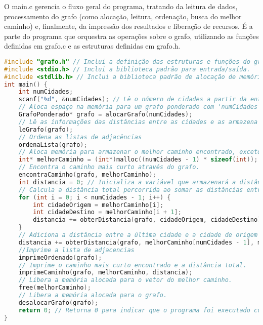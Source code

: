 \documentclass{article}
\begin{document}
O main.c gerencia o fluxo geral do programa, tratando da leitura de dados, processamento do grafo (como alocação, leitura, ordenação, busca do melhor caminho) e, finalmente, da impressão dos resultados e liberação de recursos. É a parte do programa que orquestra as operações sobre o grafo, utilizando as funções definidas em grafo.c e as estruturas definidas em grafo.h.
\begin{lstlisting}[caption={main.c},label={lst:cod1},language=C]
#include "grafo.h" // Inclui a definição das estruturas e funções do grafo.
#include <stdio.h> // Inclui a biblioteca padrão para entrada/saída.
#include <stdlib.h> // Inclui a biblioteca padrão de alocação de memória.
int main() {
    int numCidades;
    scanf("%d", &numCidades); // Lê o número de cidades a partir da entrada padrão.
    // Aloca espaço na memória para um grafo ponderado com 'numCidades'.
    GrafoPonderado* grafo = alocarGrafo(numCidades);
    // Lê as informações das distâncias entre as cidades e as armazena no grafo.
    leGrafo(grafo);
    // Ordena as listas de adjacências
    ordenaLista(grafo);
    // Aloca memória para armazenar o melhor caminho encontrado, exceto a cidade de origem.
    int* melhorCaminho = (int*)malloc((numCidades - 1) * sizeof(int));
    // Encontra o caminho mais curto através do grafo.
    encontraCaminho(grafo, melhorCaminho);
    int distancia = 0; // Inicializa a variável que armazenará a distância total do caminho.
    // Calcula a distância total percorrida ao somar as distâncias entre as cidades do caminho.
    for (int i = 0; i < numCidades - 1; i++) {
        int cidadeOrigem = melhorCaminho[i];
        int cidadeDestino = melhorCaminho[i + 1];
        distancia += obterDistancia(grafo, cidadeOrigem, cidadeDestino);
    }
    // Adiciona a distância entre a última cidade e a cidade de origem para fechar o ciclo.
    distancia += obterDistancia(grafo, melhorCaminho[numCidades - 1], melhorCaminho[0]);
    //Imprime a lista de adjacencias
    imprimeOrdenado(grafo);
    // Imprime o caminho mais curto encontrado e a distância total.
    imprimeCaminho(grafo, melhorCaminho, distancia);
    // Libera a memória alocada para o vetor do melhor caminho.
    free(melhorCaminho);
    // Libera a memória alocada para o grafo.
    desalocarGrafo(grafo);
    return 0; // Retorna 0 para indicar que o programa foi executado com sucesso.
}
\end{lstlisting}
\end{document}
